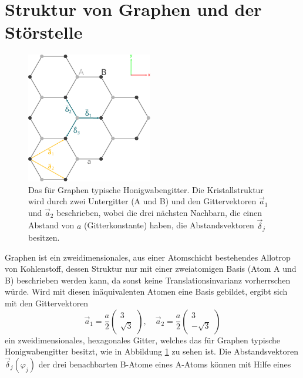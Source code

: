 \section{Struktur von Graphen und der Störstelle}
\label{sec:structure}
\begin{figure}
    \centering
    \includegraphics[width = 0.49\textwidth]{Plots/graphene_lattice.pdf}
    \caption{Das für Graphen typische Honigwabengitter. Die Kristallstruktur wird durch zwei Untergitter (A und B) und den 
    Gittervektoren $\vec{a}_1$ und $\vec{a}_2$ beschrieben, wobei
    die drei nächsten Nachbarn, die einen Abstand von $a$ (Gitterkonstante) haben, die Abstandsvektoren $\vec{\delta}_j$ besitzen.}
    \label{fig:graphene_lattice}
\end{figure}
Graphen ist ein zweidimensionales, aus einer Atomschicht bestehendes Allotrop von Kohlenstoff, dessen
Struktur nur mit einer zweiatomigen Basis (Atom A und B) beschrieben werden kann, da sonst keine Translationsinvarianz vorherrschen würde.
Wird mit diesen inäquivalenten Atomen eine Basis gebildet, ergibt sich mit den Gittervektoren 
\begin{equation*}
        \vec{a}_1 = \frac{a}{2}\begin{pmatrix} 3 \\[4pt] \sqrt{3}  \end{pmatrix}, \quad
        \vec{a}_2 = \frac{a}{2}\begin{pmatrix} 3 \\[4pt] -\sqrt{3} \end{pmatrix}       
\end{equation*}    
ein zweidimensionales, hexagonales Gitter, welches das für Graphen typische Honigwabengitter besitzt,
wie in Abbildung \ref{fig:graphene_lattice} zu sehen ist.
Die Abstandsvektoren $\vec{\delta}_j(\varphi_j)$ der drei benachbarten B-Atome eines A-Atoms können mit Hilfe eines 
